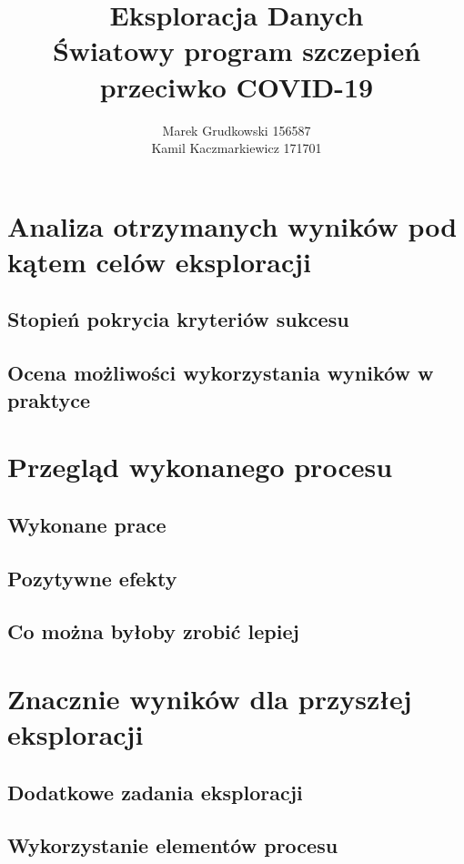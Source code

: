 \documentclass[12pt, oneside]{article}
\title{
	Eksploracja Danych \\
	Światowy program szczepień przeciwko COVID-19
}
\author{
	Marek Grudkowski 156587
	\\
	Kamil Kaczmarkiewicz 171701
}
\begin{document}
\maketitle

\section{Analiza otrzymanych wyników pod kątem celów eksploracji}

\subsection{Stopień pokrycia kryteriów sukcesu}

\subsection{Ocena możliwości wykorzystania wyników w praktyce}

\section{Przegląd wykonanego procesu}

\subsection{Wykonane prace}

\subsection{Pozytywne efekty}

\subsection{Co można byłoby zrobić lepiej}

\section{Znacznie wyników dla przyszłej eksploracji}

\subsection{Dodatkowe zadania eksploracji}

\subsection{Wykorzystanie elementów procesu}
\end{document}
